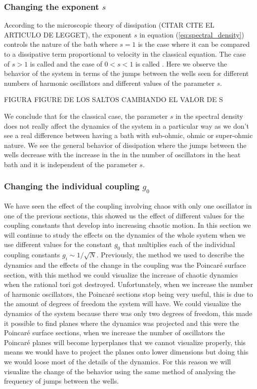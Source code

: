 \subsubsection{Changing the exponent $s$}
According to the microscopic theory of dissipation (CITAR CITE EL ARTICULO DE LEGGET), the exponent $s$ in equation (\ref{eq:spectral_density}) controls the nature of the bath where $s=1$ is the  case where it can be compared to a dissipative term proportional to velocity in the classical equation. The case of $s>1$ is called  and the case of $0<s<1$ is called . Here we observe the behavior of the system in terms of the jumps between the wells seen for different numbers of harmonic oscillators and different values of the parameter $s$. \par

FIGURA FIGURE DE LOS SALTOS CAMBIANDO EL VALOR DE S\par 

We conclude that for the classical case, the parameter $s$ in the spectral density does not really affect the dynamics of the system in a particular way as we don't see a real difference between having a bath with sub-ohmic, ohmic or super-ohmic nature. We see the general behavior of dissipation where the jumps between the wells decrease with the increase in the in the number of oscillators in the heat bath and it is independent of the parameter $s$.

\subsubsection{Changing the individual coupling $g_0$}
We have seen the effect of the coupling involving chaos with only one oscillator in one of the previous sections, this showed us the effect of different values for the coupling constants that develop into increasing chaotic motion. In this section we will continue to study the effects on the dynamics of the whole system when we use different values for the constant $g_0$ that multiplies each of the individual coupling constants $g_i \sim 1/\sqrt{N}$. Previously, the method we used to describe the dynamics and the effects of the change in the coupling was the Poincaré surface section, with this method we could visualize the increase of chaotic dynamics when the rational tori got destroyed. Unfortunately, when we increase the number of harmonic oscillators, the Poincaré sections stop being very useful, this is due to the amount of degrees of freedom the system will have. We could visualize the dynamics of the system because there was only two degrees of freedom, this made it possible to find planes where the dynamics was projected and this were the Poincaré surface sections, when we increase the number of oscillators the Poincaré planes will become hyperplanes that we cannot visualize properly, this means we would have to project the planes onto lower dimensions but doing this we would loose most of the details of the dynamics. For this reason we will visualize the change of the behavior using the same method of analysing the frequency of jumps between the wells.\par 

